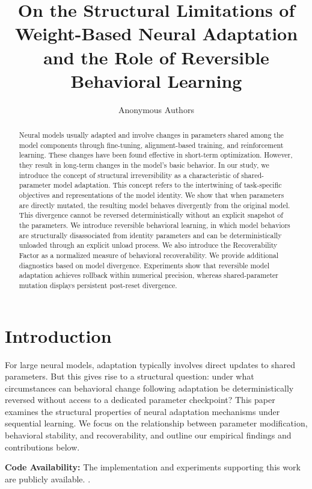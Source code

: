 \documentclass[10pt]{article}
\title{On the Structural Limitations of Weight-Based Neural Adaptation and the Role of Reversible Behavioral Learning}
\author{
\name Anonymous Authors
}
\begin{document}
\maketitle

\begin{abstract}
	Neural models usually adapted and involve changes in parameters shared among the model components through fine-tuning, alignment-based training, and reinforcement learning. These changes have been found effective in short-term optimization. However, they result in long-term changes in the model’s basic behavior. In our study, we introduce the concept of structural irreversibility as a characteristic of shared-parameter model adaptation. This concept refers to the intertwining of task-specific objectives and representations of the model identity. We show that when parameters are directly mutated, the resulting model behaves divergently from the original model. This divergence cannot be reversed deterministically without an explicit snapshot of the parameters. We introduce reversible behavioral learning, in which model behaviors are structurally disassociated from identity parameters and can be deterministically unloaded through an explicit unload process. We also introduce the Recoverability Factor as a normalized measure of behavioral recoverability. We provide additional diagnostics based on model divergence. Experiments show that reversible model adaptation achieves rollback within numerical precision, whereas shared-parameter mutation displays persistent post-reset divergence.
\end{abstract}

\section{Introduction}
	\label{sec:intro}
	For large neural models, adaptation typically involves direct updates to shared parameters. But this gives rise to a structural question: under what circumstances can behavioral change following adaptation be deterministically reversed without access to a dedicated parameter checkpoint? This paper examines the structural properties of neural adaptation mechanisms under sequential learning. We focus on the relationship between parameter modification, behavioral stability, and recoverability, and outline our empirical findings and contributions below.
	
	\noindent\textbf{Code Availability:} 
	The implementation and experiments supporting this work are publicly available. \cite{varma2026rlae}.
	
\end{document}
